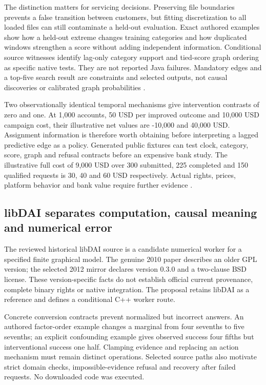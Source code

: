 The distinction matters for servicing decisions. Preserving file
boundaries prevents a false transition between customers, but fitting
discretization to all loaded files can still contaminate a held-out
evaluation. Exact authored examples show how a held-out extreme changes
training categories and how duplicated windows strengthen a score
without adding independent information. Conditional source witnesses
identify lag-only category support and tied-score graph ordering as
specific native tests. They are not reported Java failures. Mandatory
edges and a top-five search result are constraints and selected outputs,
not causal discoveries or calibrated graph probabilities
\citep{exec24_banjo_source,exec24_banjo_choice}.

Two observationally identical temporal mechanisms give intervention
contrasts of zero and one. At 1,000 accounts, 50 USD per improved
outcome and 10,000 USD campaign cost, their illustrative net values are
-10,000 and 40,000 USD. Assignment information is therefore worth
obtaining before interpreting a lagged predictive edge as a policy.
Generated public fixtures can test clock, category, score, graph and
refusal contracts before an expensive bank study. The illustrative full
cost of 9,000 USD over 300 submitted, 225 completed and 150 qualified
requests is 30, 40 and 60 USD respectively. Actual rights, prices,
platform behavior and bank value require further evidence
\citep{exec24_banjo_choice}.

\hypertarget{libdai-separates-computation-causal-meaning-and-numerical-error}{%
\subsection{libDAI separates computation, causal meaning and numerical
error}\label{libdai-separates-computation-causal-meaning-and-numerical-error}}

The reviewed historical libDAI source is a candidate numerical worker
for a specified finite graphical model. The genuine 2010 paper describes
an older GPL version; the selected 2012 mirror declares version 0.3.0
and a two-clause BSD license. These version-specific facts do not
establish official current provenance, complete binary rights or native
integration. The proposal retains libDAI as a reference and defines a
conditional C++ worker route.
\citep{exec24_libdai_paper,exec24_libdai_source,exec24_libdai_choice}

Concrete conversion contracts prevent normalized but incorrect answers.
An authored factor-order example changes a marginal from four sevenths
to five sevenths; an explicit confounding example gives observed success
four fifths but interventional success one half. Clamping evidence and
replacing an action mechanism must remain distinct operations. Selected
source paths also motivate strict domain checks, impossible-evidence
refusal and recovery after failed requests. No downloaded code was
executed. \citep{exec24_libdai_source,exec24_libdai_choice}

